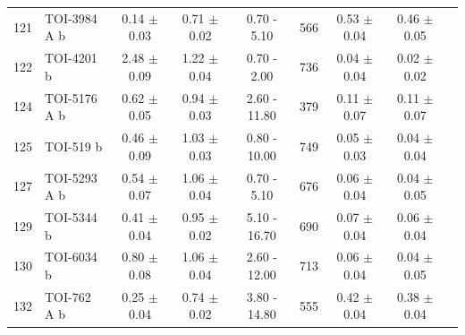 \begin{longtable}{llccccccc}
121 & TOI-3984 A b & 0.14 $\pm$ 0.03 & 0.71 $\pm$ 0.02 & 0.70 - 5.10 & 566 & 0.53 $\pm$ 0.04 & 0.46 $\pm$ 0.05 \\
122 & TOI-4201 b & 2.48 $\pm$ 0.09 & 1.22 $\pm$ 0.04 & 0.70 - 2.00 & 736 & 0.04 $\pm$ 0.04 & 0.02 $\pm$ 0.02 \\
124 & TOI-5176 A b & 0.62 $\pm$ 0.05 & 0.94 $\pm$ 0.03 & 2.60 - 11.80 & 379 & 0.11 $\pm$ 0.07 & 0.11 $\pm$ 0.07 \\
125 & TOI-519 b & 0.46 $\pm$ 0.09 & 1.03 $\pm$ 0.03 & 0.80 - 10.00 & 749 & 0.05 $\pm$ 0.03 & 0.04 $\pm$ 0.04 \\
127 & TOI-5293 A b & 0.54 $\pm$ 0.07 & 1.06 $\pm$ 0.04 & 0.70 - 5.10 & 676 & 0.06 $\pm$ 0.04 & 0.04 $\pm$ 0.05 \\
129 & TOI-5344 b & 0.41 $\pm$ 0.04 & 0.95 $\pm$ 0.02 & 5.10 - 16.70 & 690 & 0.07 $\pm$ 0.04 & 0.06 $\pm$ 0.04 \\
130 & TOI-6034 b & 0.80 $\pm$ 0.08 & 1.06 $\pm$ 0.04 & 2.60 - 12.00 & 713 & 0.06 $\pm$ 0.04 & 0.04 $\pm$ 0.05 \\
132 & TOI-762 A b & 0.25 $\pm$ 0.04 & 0.74 $\pm$ 0.02 & 3.80 - 14.80 & 555 & 0.42 $\pm$ 0.04 & 0.38 $\pm$ 0.04
\label{tab:gastli_planetsynth_catalogue}
\end{longtable}